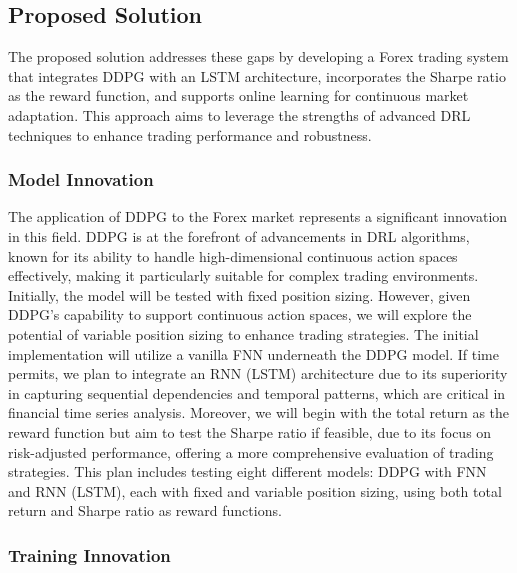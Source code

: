 \subsection{Proposed Solution}

The proposed solution addresses these gaps by developing a Forex trading system that integrates DDPG with an LSTM architecture, incorporates the Sharpe ratio as the reward function, and supports online learning for continuous market adaptation. This approach aims to leverage the strengths of advanced DRL techniques to enhance trading performance and robustness.

\subsubsection{Model Innovation}

The application of DDPG to the Forex market represents a significant innovation in this field. DDPG is at the forefront of advancements in DRL algorithms, known for its ability to handle high-dimensional continuous action spaces effectively, making it particularly suitable for complex trading environments. Initially, the model will be tested with fixed position sizing. However, given DDPG's capability to support continuous action spaces, we will explore the potential of variable position sizing to enhance trading strategies. The initial implementation will utilize a vanilla FNN underneath the DDPG model. If time permits, we plan to integrate an RNN (LSTM) architecture due to its superiority in capturing sequential dependencies and temporal patterns, which are critical in financial time series analysis. Moreover, we will begin with the total return as the reward function but aim to test the Sharpe ratio if feasible, due to its focus on risk-adjusted performance, offering a more comprehensive evaluation of trading strategies. This plan includes testing eight different models: DDPG with FNN and RNN (LSTM), each with fixed and variable position sizing, using both total return and Sharpe ratio as reward functions.

\subsubsection{Training Innovation}

